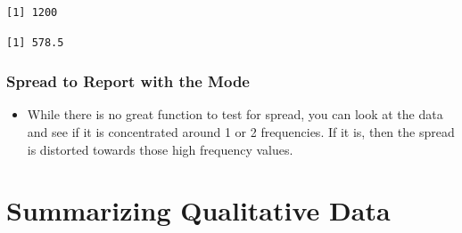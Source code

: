 \documentclass[
  letterpaper,
  DIV=11,
  numbers=noendperiod]{scrreprt}
\newenvironment{Shaded}{\begin{snugshade}}{\end{snugshade}}
\newcommand{\AttributeTok}[1]{\textcolor[rgb]{0.40,0.45,0.13}{#1}}
\newcommand{\ConstantTok}[1]{\textcolor[rgb]{0.56,0.35,0.01}{#1}}
\newcommand{\FunctionTok}[1]{\textcolor[rgb]{0.28,0.35,0.67}{#1}}
\newcommand{\NormalTok}[1]{\textcolor[rgb]{0.00,0.23,0.31}{#1}}
\newcommand{\SpecialCharTok}[1]{\textcolor[rgb]{0.37,0.37,0.37}{#1}}
\providecommand{\tightlist}{%
  \setlength{\itemsep}{0pt}\setlength{\parskip}{0pt}}\usepackage{longtable,booktabs,array}
\begin{document}
\begin{itemize}
\begin{verbatim}
[1] 1200
\end{verbatim}

\begin{Shaded}
\end{Shaded}

\begin{verbatim}
[1] 578.5
\end{verbatim}
\end{itemize}

\subsection{Spread to Report with the
Mode}\label{spread-to-report-with-the-mode}

\begin{itemize}
\tightlist
\item
  While there is no great function to test for spread, you can look at
  the data and see if it is concentrated around 1 or 2 frequencies. If
  it is, then the spread is distorted towards those high frequency
  values.
\end{itemize}


\chapter{Summarizing Qualitative
Data}\label{summarizing-qualitative-data}
\end{document}
